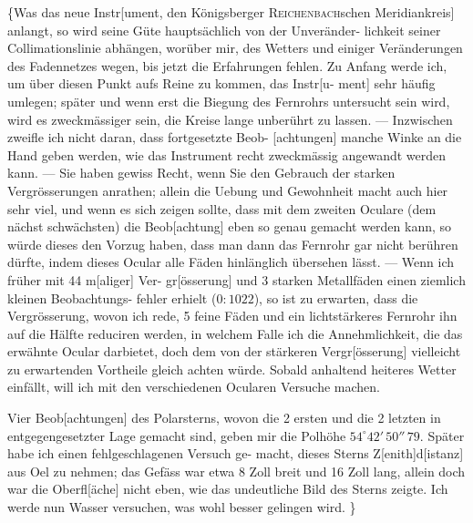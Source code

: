 \documentclass[12pt,a4paper]{article}
\theoremstyle{plain}
\theoremstyle{definition}
\theoremstyle{remark}
\begin{document}
\medskip
\{\dotfill Was das neue Instr[ument, den K\"{o}nigsberger \textsc{Reichenbach}schen
Meridiankreis] anlangt, so wird seine G\"{u}te haupts\"{a}chlich von der Unver\"{a}nder-
lichkeit seiner Collimationslinie abh\"{a}ngen, wor\"{u}ber mir, des Wetters und einiger
Ver\"{a}nderungen des Fadennetzes wegen, bis jetzt die Erfahrungen fehlen. Zu
Anfang werde ich, um \"{u}ber diesen Punkt aufs Reine zu kommen, das Instr[u-
ment] sehr h\"{a}ufig umlegen; sp\"{a}ter und wenn erst die Biegung des Fernrohrs
untersucht sein wird, wird es zweckm\"{a}ssiger sein, die Kreise lange unber\"{u}hrt
zu lassen. --- Inzwischen zweifle ich nicht daran, dass fortgesetzte Beob-
[achtungen] manche Winke an die Hand geben werden, wie das Instrument
recht zweckm\"{a}ssig angewandt werden kann. --- Sie haben gewiss Recht, wenn
Sie den Gebrauch der starken Vergr\"{o}sserungen anrathen; allein die Uebung
und Gewohnheit macht auch hier sehr viel, und wenn es sich zeigen sollte,
dass mit dem zweiten Oculare (dem n\"{a}chst schw\"{a}chsten) die Beob[achtung]
eben so genau gemacht werden kann, so w\"{u}rde dieses den Vorzug haben,
dass man dann das Fernrohr gar nicht ber\"{u}hren d\"{u}rfte, indem dieses Ocular
alle F\"{a}den hinl\"{a}nglich \"{u}bersehen l\"{a}sst. --- Wenn ich fr\"{u}her mit 44 m[aliger] Ver-
gr[\"{o}sserung] und 3 starken Metallf\"{a}den einen ziemlich kleinen Beobachtungs-
fehler erhielt ($0\!\!:\!\!1022$), so ist zu erwarten, dass die Vergr\"{o}sserung, wovon ich
rede, 5 feine F\"{a}den und ein lichtst\"{a}rkeres Fernrohr ihn auf die H\"{a}lfte reduciren
werden, in welchem Falle ich die Annehmlichkeit, die das erw\"{a}hnte Ocular
darbietet, doch dem von der st\"{a}rkeren Vergr[\"{o}sserung] vielleicht zu erwartenden
Vortheile gleich achten w\"{u}rde. Sobald anhaltend heiteres Wetter einf\"{a}llt,
will ich mit den verschiedenen Ocularen Versuche machen. \dotfill

\dotfill Vier Beob[achtungen] des Polarsterns, wovon die 2 ersten
und die 2 letzten in entgegengesetzter Lage gemacht sind, geben mir die
Polh\"{o}he $54^\circ 42'\,50''\,79$. Sp\"{a}ter habe ich einen fehlgeschlagenen Versuch ge-
macht, dieses Sterns Z[enith]d[istanz] aus Oel zu nehmen; das Gef\"{a}ss war etwa
8 Zoll breit und 16 Zoll lang, allein doch war die Oberfl[\"{a}che] nicht eben,
wie das undeutliche Bild des Sterns zeigte. Ich werde nun Wasser versuchen,
was wohl besser gelingen wird. \}
\end{document}
